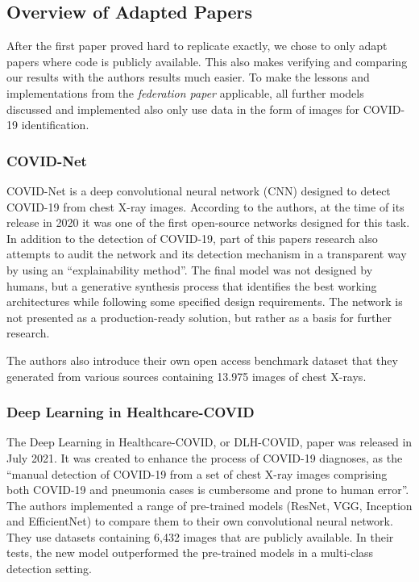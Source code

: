 \subsection{Overview of Adapted Papers}\label{subsec:methods_adapted_papers}
After the first paper proved hard to replicate exactly, we chose to only adapt papers where code is publicly available. This also makes verifying and comparing our results with the authors results much easier.
To make the lessons and implementations from the \textit{federation paper} applicable, all further models discussed and implemented also only use data in the form of images for COVID-19 identification.

\subsubsection{COVID-Net}
COVID-Net\cite{covid_net} is a deep convolutional neural network (CNN) designed to detect COVID-19 from chest X-ray images. According to the authors, at the time of its release in 2020 it was one of the first open-source networks designed for this task. In addition to the detection of COVID-19, part of this papers research also attempts to audit the network and its detection mechanism in a transparent way by using an \enquote{explainability method}\cite{covid_net}. The final model was not designed by humans, but a generative synthesis process that identifies the best working architectures while following some specified design requirements. 
The network is not presented as a production-ready solution, but rather as a basis for further research.

The authors also introduce their own open access benchmark dataset that they generated from various sources containing 13.975 images of chest X-rays.

\subsubsection{Deep Learning in Healthcare-COVID}
The Deep Learning in Healthcare-COVID, or DLH-COVID, paper was released in July 2021. It was created to enhance the process of COVID-19 diagnoses, as the \enquote{manual detection of COVID-19 from a set of chest X-ray images comprising both COVID-19 and pneumonia cases is cumbersome and prone to human error}\cite{dlh_net}. The authors implemented a range of pre-trained models (ResNet, VGG, Inception and EfficientNet) to compare them to their own convolutional neural network. They use datasets containing 6,432 images that are publicly available. In their tests, the new model outperformed the pre-trained models in a multi-class detection setting.

